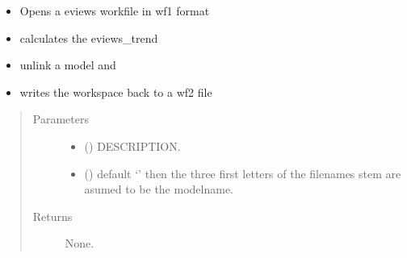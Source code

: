 \documentclass[letterpaper,10pt,english]{sphinxmanual}
\begin{document}
\begin{fulllineitems}
\label{\detokenize{onboard/modelgrabwf2:modelgrabwf2.wf1_to_wf2}}
\pysigstartsignatures
{}
\pysigstopsignatures\begin{itemize}
\item {} 
\sphinxAtStartPar
Opens a eviews workfile in wf1 format

\item {} 
\sphinxAtStartPar
calculates the eviews\_trend

\item {} 
\sphinxAtStartPar
unlink a model and

\item {} 
\sphinxAtStartPar
writes the workspace back to a wf2 file

\end{itemize}
\begin{quote}\begin{description}
\item[{Parameters}] \leavevmode\begin{itemize}
\item {} 
\sphinxAtStartPar
{} () \textendash{} DESCRIPTION.

\item {} 
\sphinxAtStartPar
{} () \textendash{} default ‘’ then the three first letters of the filenames stem are asumed to be the modelname.

\end{itemize}

\item[{Returns}] \leavevmode
\sphinxAtStartPar
None.

\end{description}\end{quote}

\end{fulllineitems}

\end{document}
